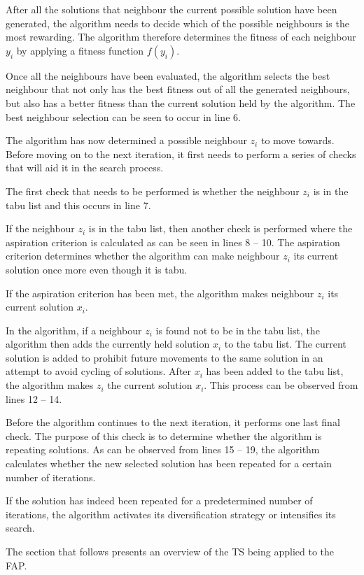 After all the solutions that neighbour the current possible solution have been generated, the algorithm needs to decide which of the possible neighbours is the most rewarding. The algorithm therefore determines the fitness of each neighbour $y_i$ by applying a fitness function $f(y_i)$. 

Once all the neighbours have been evaluated, the algorithm selects the best neighbour that not only has the best fitness out of all the generated neighbours, but also has a better fitness than the current solution held by the algorithm. The best neighbour selection can be seen to occur in line 6.

The algorithm has now determined a possible neighbour $z_i$ to move towards. Before moving on to the next iteration, it first needs to perform a series of checks that will aid it in the search process.

The first check that needs to be performed is whether the neighbour $z_i$ is in the tabu list and this occurs in line 7. 

If the neighbour $z_i$ is in the tabu list, then another check is performed where the aspiration criterion is calculated as can be seen in lines 8 -- 10. The aspiration criterion determines whether the algorithm can make neighbour $z_i$ its current solution once more even though it is tabu. 

If the aspiration criterion has been met, the algorithm makes neighbour $z_i$ its current solution $x_i$. 

In the algorithm, if a neighbour $z_i$ is found not to be in the tabu list, the algorithm then adds the currently held solution $x_i$ to the tabu list. The current solution is added to prohibit future movements to the same solution in an attempt to avoid cycling of solutions. After $x_i$ has been added to the tabu list, the algorithm makes $z_i$ the current solution $x_i$. This process can be observed from lines 12 -- 14.

Before the algorithm continues to the next iteration, it performs one last final check. The purpose of this check is to determine whether the algorithm is repeating solutions. As can be observed from lines 15 -- 19, the algorithm calculates whether the new selected solution has been repeated for a certain number of iterations. 

If the solution has indeed been repeated for a predetermined number of iterations, the algorithm activates its diversification strategy or intensifies its search.

The section that follows presents an overview of the \gls{TS} being applied to the \gls{FAP}.
